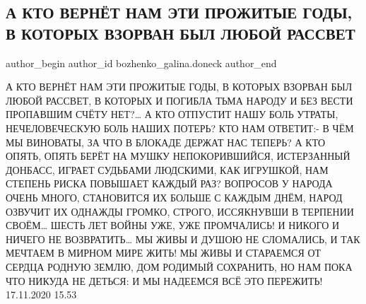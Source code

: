  
 
 
 
 
 
\subsection{А КТО ВЕРНЁТ НАМ ЭТИ ПРОЖИТЫЕ ГОДЫ, В КОТОРЫХ ВЗОРВАН БЫЛ ЛЮБОЙ РАССВЕТ}
\label{sec:19_11_2020.fb.bozhenko_galina.doneck.1.stihi_vojna}
 
\ifcmt
 author_begin
   author_id bozhenko_galina.doneck
 author_end
\fi

\obeycr
А КТО ВЕРНЁТ НАМ ЭТИ ПРОЖИТЫЕ ГОДЫ,
В КОТОРЫХ ВЗОРВАН БЫЛ ЛЮБОЙ РАССВЕТ,
В КОТОРЫХ И ПОГИБЛА ТЬМА НАРОДУ
И БЕЗ ВЕСТИ ПРОПАВШИМ СЧЁТУ НЕТ?…
А КТО ОТПУСТИТ НАШУ БОЛЬ УТРАТЫ,
НЕЧЕЛОВЕЧЕСКУЮ БОЛЬ НАШИХ ПОТЕРЬ?
КТО НАМ ОТВЕТИТ:- В ЧЁМ МЫ ВИНОВАТЫ,
ЗА ЧТО В БЛОКАДЕ ДЕРЖАТ НАС ТЕПЕРЬ?
А КТО ОПЯТЬ, ОПЯТЬ БЕРЁТ НА МУШКУ
НЕПОКОРИВШИЙСЯ, ИСТЕРЗАННЫЙ ДОНБАСС,
ИГРАЕТ СУДЬБАМИ ЛЮДСКИМИ, КАК ИГРУШКОЙ,
НАМ СТЕПЕНЬ РИСКА ПОВЫШАЕТ КАЖДЫЙ РАЗ?
ВОПРОСОВ У НАРОДА ОЧЕНЬ МНОГО,
СТАНОВИТСЯ ИХ БОЛЬШЕ С КАЖДЫМ ДНЁМ,
НАРОД ОЗВУЧИТ ИХ ОДНАЖДЫ ГРОМКО, СТРОГО,
ИССЯКНУВШИ В ТЕРПЕНИИ СВОЁМ…
ШЕСТЬ ЛЕТ ВОЙНЫ УЖЕ, УЖЕ ПРОМЧАЛИСЬ!
И НИКОГО И НИЧЕГО НЕ ВОЗВРАТИТЬ…
МЫ ЖИВЫ И ДУШОЮ НЕ СЛОМАЛИСЬ,
И ТАК МЕЧТАЕМ В МИРНОМ МИРЕ ЖИТЬ!
МЫ ЖИВЫ И СТАРАЕМСЯ ОТ СЕРДЦА
РОДНУЮ ЗЕМЛЮ, ДОМ РОДИМЫЙ СОХРАНИТЬ,
НО НАМ ПОКА ЧТО НИКУДА НЕ ДЕТЬСЯ:
И МЫ НАДЕЕМСЯ ВСЁ ЭТО ПЕРЕЖИТЬ!
17.11.2020 15.53
\restorecr
